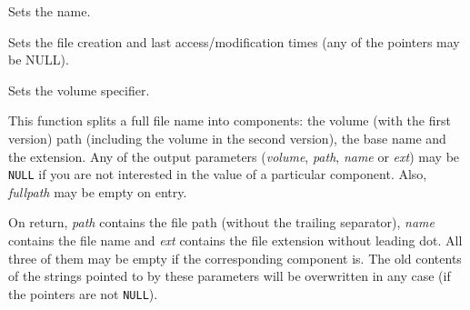 
Sets the name.


\label{wxfilenamesettimes}


Sets the file creation and last access/modification times (any of the pointers may be NULL).


\label{wxfilenamesetvolume}


Sets the volume specifier.


\label{wxfilenamesplitpath}



This function splits a full file name into components: the volume (with the
first version) path (including the volume in the second version), the base name
and the extension. Any of the output parameters ({\it volume}, {\it path}, 
{\it name} or {\it ext}) may be {\tt NULL} if you are not interested in the
value of a particular component. Also, {\it fullpath} may be empty on entry.

On return, {\it path} contains the file path (without the trailing separator), 
{\it name} contains the file name and {\it ext} contains the file extension
without leading dot. All three of them may be empty if the corresponding
component is. The old contents of the strings pointed to by these parameters
will be overwritten in any case (if the pointers are not {\tt NULL}).


\label{wxfilenamesplitvolume}


